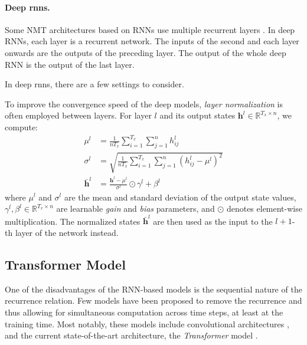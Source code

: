 \paragraph{Deep \acp{rnn}.} Some NMT architectures based on RNNs use multiple
recurrent layers \citep{barone2017deep,wu2016google}. In deep RNNs, each layer
is a recurrent network. The inputs of the second and each layer onwards are the
outputs of the preceding layer. The output of the whole deep RNN is the output
of the last layer.

In deep \acp{rnn}, there are a few settings to consider. 

  To improve the convergence
speed of the deep models, \emph{layer normalization} \citep{ba2016layer} is
often employed between layers. For layer $l$ and its output states
$\mathbf{h}^l \in \mathbb{R}^{T_x \times n}$, we compute:
%
\begin{align}
  \mu^l &= \frac{1}{nT_x} \sum_{i=1}^{T_x}\sum_{j=1}^n h^l_{ij} \\
  \sigma^l &= \sqrt{\frac{1}{nT_x} \sum_{i=1}^{T_x}\sum_{j=1}^n (h^l_{ij} - \mu^l)^2} \\
  \bar{\mathbf{h}}^l &= \frac{\mathbf{h}^l - \mu^l}{\sigma^l} \odot \gamma^l + \beta^l
\end{align}
%
where $\mu^l$ and $\sigma^l$ are the mean and standard deviation of the output
state values, $\gamma^l, \beta^l \in \mathbb{R}^{T_x \times n}$ are learnable
\emph{gain} and \emph{bias} parameters, and $\odot$ denotes element-wise
multiplication. The normalized states $\bar{\mathbf{h}}^l$ are then used as the
input to the $l+1$-th layer of the network instead.




\subsection{Transformer Model}
\label{sec:encdec:transformer}

One of the disadvantages of the RNN-based models is the sequential nature of
the recurrence relation. Few models have been proposed to remove the recurrence
and thus allowing for simultaneous computation across time steps, at least at
the training time. Most notably, these models include convolutional
architectures \citep{gehring2017convolutional}, and the current
state-of-the-art architecture, the \emph{Transformer} model
\citep{vaswani2017attention}.

